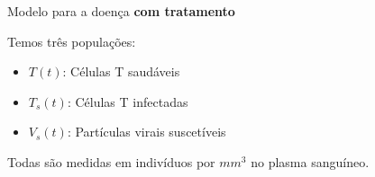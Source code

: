 \documentclass[13pt]{beamer}
\begin{document}
\begin{frame}{Modelo para a doença \textbf{com tratamento}}

% 
% 

    Temos três populações:
    \begin{itemize}
        \item \( T ( t ) \): Células T saudáveis
        \item \( T_{ s } ( t ) \): Células T infectadas
        \item \( V_{ s } ( t ) \): Partículas virais suscetíveis
    \end{itemize}

    Todas são medidas em indivíduos por \( \unit{mm^{ 3 }} \) no plasma sanguíneo.
    
\end{frame}
\end{document}
